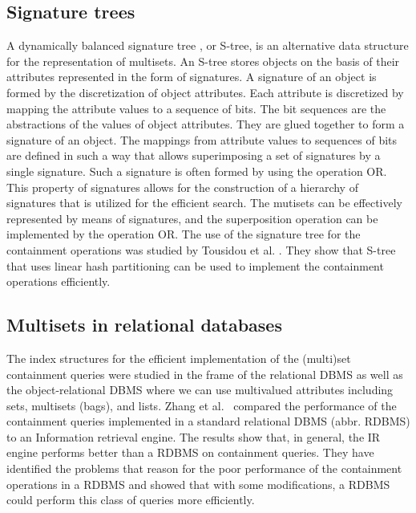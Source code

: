
\subsection{Signature trees\label{rel-signature}}

A dynamically balanced signature tree \cite{Deppisch1986,Pfaltz1980}, or S-tree, is an alternative data structure for the representation of multisets. An S-tree stores objects on the basis of their attributes represented in the form of signatures. A signature of an object is formed by the discretization of object attributes. Each attribute is discretized by mapping the attribute values to a sequence of bits. The bit sequences are the abstractions of the values of object attributes. They are glued together to form a signature of an object. The mappings from attribute values to sequences of bits are defined in such a way that allows superimposing a set of signatures by a single signature. Such a signature is often formed by using the operation OR. This property of signatures allows for the construction of a hierarchy of signatures that is utilized for the efficient search. The mutisets can be effectively represented by means of signatures, and the superposition operation can be implemented by the operation OR. The use of the signature tree for the containment operations was studied by Tousidou et al. \cite{tousidou2002sigstruc}. They show that S-tree that uses linear hash partitioning can be used to implement the containment operations efficiently. 

\subsection{Multisets in relational databases\label{rel-dbms}}

The index structures for the efficient implementation of the (multi)set containment queries were studied in the frame of the relational DBMS as well as the object-relational DBMS where we can use multivalued attributes including sets, multisets (bags), and lists. Zhang et al.\ \cite{Zhang2001} compared the performance of the containment queries implemented in a standard relational DBMS (abbr. RDBMS) to an Information retrieval engine. The results show that, in general, the IR engine performs better than a RDBMS on containment queries. They have identified the problems that reason for the poor performance of the containment operations in a RDBMS and showed that with some modifications, a RDBMS could perform this class of queries more efficiently. 


